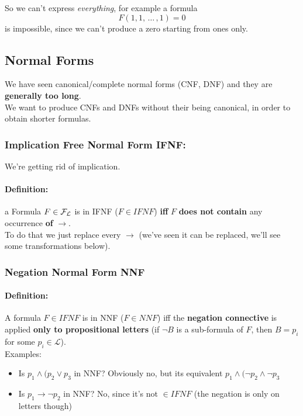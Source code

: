 \documentclass[11pt]{article}
\begin{document}
	So we can't express \textit{everything}, for example a formula
	$$ F(1,1, \, \dots \, , 1) = 0 $$
	is impossible, since we can't produce a zero starting from ones only.\\
	
	\newpage
	
	\subsection{Normal Forms}
	
	We have seen canonical/complete normal forms (CNF, DNF) and they are \textbf{generally too long}.\\
	We want to produce CNFs and DNFs without their being canonical, in order to obtain shorter formulas.\\
	
	\subsubsection{Implication Free Normal Form IFNF:} 
	
	We're getting rid of implication.\\
	
	\paragraph{Definition:} a Formula $F \in \mathcal{F}_\mathcal{L}$ is in IFNF ($F \in IFNF$) \textbf{iff} $F$ \textbf{does not contain} any occurrence \textbf{of} $\rightarrow$.\\
	
	To do that we just replace every $\rightarrow$ (we've seen it can be replaced, we'll see some transformations below).\\
	
	\subsubsection{Negation Normal Form NNF}
	
	\paragraph{Definition:} A formula $F \in IFNF$ is in NNF ($F \in NNF$) iff the \textbf{negation connective} is applied \textbf{only to propositional letters} (if $\neg B$ is a sub-formula of $F$, then $B = p_i$ for some $p_i \in \mathcal{L}$).\\
	
	Examples: 
	\begin{itemize}
		\item Is $p_1 \wedge (p_2 \vee p_3$ in NNF?
		Obviously no, but its equivalent $p_1 \wedge (\neg p_2 \wedge \neg p_3$
		\item Is $p_1 \rightarrow \neg p_2$ in NNF? No, since it's not $\in IFNF$ (the negation is only on letters though)
	\end{itemize}
	
\end{document}

